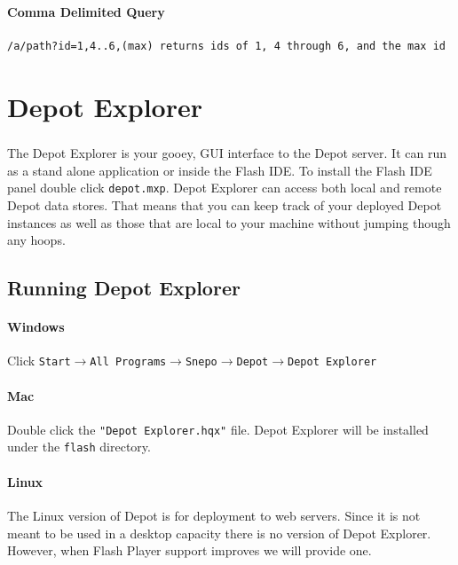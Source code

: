 \documentclass{report}
\begin{document}
\subsubsection{Comma Delimited Query}
\begin{Verbatim}[frame=single]
/a/path?id=1,4..6,(max) returns ids of 1, 4 through 6, and the max id 
\end{Verbatim}
\paragraph{}


\chapter{Depot Explorer}

\paragraph{}
The Depot Explorer is your gooey, GUI interface to the Depot server.
It can run as a stand alone application or inside the Flash IDE. To
install the Flash IDE panel double click \texttt{depot.mxp}. Depot
Explorer can access both local and remote Depot data stores. That
means that you can keep track of your deployed Depot instances as well
as those that are local to your machine without jumping though any
hoops.

\section{Running Depot Explorer}
\subsubsection{Windows}
Click \texttt{Start$\rightarrow$All
  Programs$\rightarrow$Snepo$\rightarrow$Depot$\rightarrow$Depot
  Explorer}

\subsubsection {Mac}
Double click the \texttt{"Depot Explorer.hqx"} file. Depot Explorer will 
be installed under the \texttt{flash} directory.

\subsubsection{Linux}
The Linux version of Depot is for deployment to web servers. Since it
is not meant to be used in a desktop capacity there is no version of
Depot Explorer. However, when Flash Player support improves we will
provide one.
\end{document}
